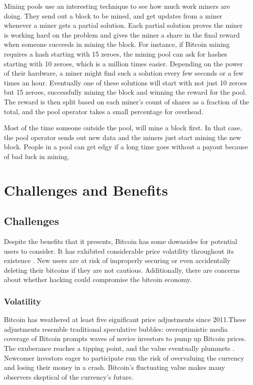 Mining pools use an interesting technique to see how much work miners are doing. They send out a block to be mined, and get updates from a miner whenever a miner gets a partial solution. Each partial solution proves the miner is working hard on the problem and gives the miner a share in the final reward when someone succeeds in mining the block.
For instance, if Bitcoin mining requires a hash starting with 15 zeroes, the mining pool can ask for hashes starting with 10 zeroes, which is a million times easier. Depending on the power of their hardware, a miner might find such a solution every few seconds or a few times an hour. Eventually one of these solutions will start with not just 10 zeroes but 15 zeroes, successfully mining the block and winning the reward for the pool. The reward is then split based on each miner's count of shares as a fraction of the total, and the pool operator takes a small percentage for overhead.

Most of the time someone outside the pool, will mine a block first. In that case, the pool operator sends out new data and the miners just start mining the new block. People in a pool can get edgy if a long time goes without a payout because of bad luck in mining\cite{bergstra2014bitcoin}.


\chapter{Challenges and Benefits}

\section{Challenges}
Despite the benefits that it presents, Bitcoin has some downsides
for potential users to consider. It has exhibited considerable
price volatility throughout its existence\cite{luther2013cryptocurrencies} . New users are at risk of
improperly securing or even accidentally deleting their bitcoins
if they are not cautious. Additionally, there are concerns about
whether hacking could compromise the bitcoin economy.

\subsection{Volatility}
Bitcoin has weathered at least five significant price adjustments
since 2011.These adjustments resemble traditional speculative
bubbles: overoptimistic media coverage of Bitcoin prompts waves
of novice investors to pump up Bitcoin prices. The exuberance
reaches a tipping point, and the value eventually plummets\cite{luther2013cryptocurrencies} .
Newcomer investors eager to participate run the risk of overvaluing
the currency and losing their money in a crash. Bitcoin’s fluctuating
value makes many observers skeptical of the currency’s
future.

